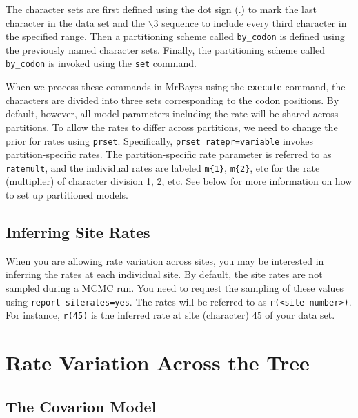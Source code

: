 \documentclass[12pt]{book}
\newcommand{\ttt}[1]{\texttt{#1}}
\begin{document}
The character sets are first defined using the dot sign (.) to mark the last character in the data
set and the $\backslash$3 sequence to include every third character in the specified range. Then a
partitioning scheme called \ttt{by\_codon} is defined using the previously named character sets.
Finally, the partitioning scheme called \ttt{by\_codon} is invoked using the \ttt{set} command.

When we process these commands in MrBayes using the \ttt{execute} command, the characters are
divided into three sets corresponding to the codon positions. By default, however, all model
parameters including the rate will be shared across partitions. To allow the rates to differ across
partitions, we need to change the prior for rates using \ttt{prset}. Specifically, \ttt{prset
ratepr=variable} invokes partition-specific rates. The partition-specific rate parameter is
referred to as \ttt{ratemult}, and the individual rates are labeled \ttt{m\{1\}}, \ttt{m\{2\}}, etc
for the rate (multiplier) of character division 1, 2, etc. See below for more information on how to
set up partitioned models.

\subsection{Inferring Site Rates}

When you are allowing rate variation across sites, you may be interested in inferring the rates at
each individual site. By default, the site rates are not sampled during a MCMC run. You need to
request the sampling of these values using \ttt{report siterates=yes}. The rates will be referred
to as \ttt{r(<site number>)}. For instance, \ttt{r(45)} is the inferred rate at site (character) 45
of your data set.

\section{Rate Variation Across the Tree}

\subsection{The Covarion Model}
\end{document}
